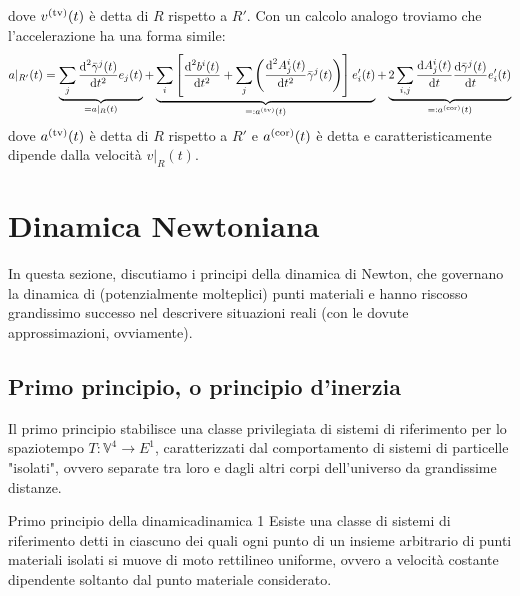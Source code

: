 \documentclass[openany]{book}
\renewcommand\V{\mathbb{V}}
\begin{document}
dove $v^{\text{(tv)}}(t)$ è detta  di $R$ rispetto a $R'$. Con un calcolo analogo troviamo che l'accelerazione ha una forma simile:
\[ a|_{R'}(t) = \underbrace{\sum_j \frac{\text{d}^2 \bar\gamma^j(t)}{\text{d} t^2} e_j(t)}_{=a|_R(t)} + \underbrace{\sum_i \left[ \frac{\text{d}^2 b^i(t)}{\text{d} t^2} + \sum_j\left( \frac{\text{d}^2 A^i_j(t)}{\text{d} t^2} \bar\gamma^j(t) \right) \right]e'_i(t)}_{=: a^{\text{(tv)}} (t)} + \underbrace{2\sum_{i,j} \frac{\text{d} A^i_j(t)}{\text{d} t} \frac{\text{d} \bar\gamma^j(t)}{\text{d} t} e'_i(t)}_{=: a^{\text{(cor)}}(t)} \]
dove $a^{\text{(tv)}}(t)$ è detta  di $R$ rispetto a $R'$ e $a^{\text{(cor)}}(t)$ è detta  e caratteristicamente dipende dalla velocità $v|_R(t)$.

\newpage
\section{Dinamica Newtoniana}

In questa sezione, discutiamo i principi della dinamica di Newton, che governano la dinamica di (potenzialmente molteplici) punti materiali e hanno riscosso grandissimo successo nel descrivere situazioni reali (con le dovute approssimazioni, ovviamente).

\subsection{Primo principio, o principio d'inerzia}

Il primo principio stabilisce una classe privilegiata di sistemi di riferimento per lo spaziotempo $T:\V^4\to E^1$, caratterizzati dal comportamento di sistemi di particelle "isolati", ovvero separate tra loro e dagli altri corpi dell'universo da grandissime distanze.

\begin{axiom}{Primo principio della dinamica}{dinamica 1}
    Esiste una classe di sistemi di riferimento detti  in ciascuno dei quali ogni punto di un insieme arbitrario di punti materiali isolati si muove di moto rettilineo uniforme, ovvero a velocità costante dipendente soltanto dal punto materiale considerato.
\end{axiom}
\end{document}
